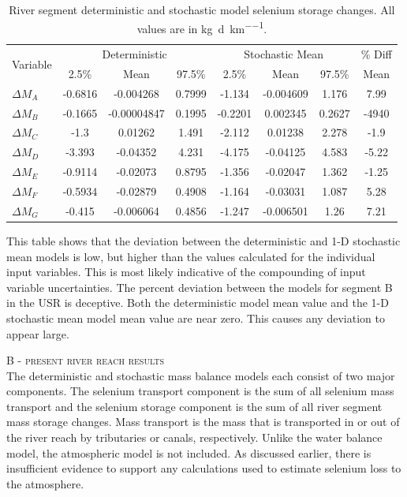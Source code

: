 \begin{linenumbers}
\begin{table}[htbp]
\centering
\caption[River segment deterministic and stochastic model selenium storage changes.]{River segment deterministic and stochastic model selenium storage changes.  All values are in \si{\kilo\gram\per\day\per\kilo\meter}.}
\label{tab:ReachSeStore}
    \begin{tabular}{l|ccc|ccc|c}
    \toprule
    \multirow{2}[0]{*}{Variable} & \multicolumn{3}{c}{Deterministic} & \multicolumn{3}{c}{Stochastic Mean} & \% Diff\\\cline{2-4} \cline{5-7}
    & 2.5\% & Mean & 97.5\% & 2.5\% & Mean & 97.5\% & Mean\\
    \midrule
    \midrule
	$\Delta M_A$&	-0.6816&	-0.004268&	0.7999&	-1.134&	-0.004609&	1.176&	7.99\\         
	$\Delta M_B$&	-0.1665&	-0.00004847&	0.1995&	-0.2201&	0.002345&	0.2627&	-4940\\
	$\Delta M_C$&	-1.3&	0.01262&	1.491&	-2.112&	0.01238&	2.278&	-1.9\\             
	$\Delta M_D$&	-3.393&	-0.04352&	4.231&	-4.175&	-0.04125&	4.583&	-5.22\\            
	$\Delta M_E$&	-0.9114&	-0.02073&	0.8795&	-1.356&	-0.02047&	1.362&	-1.25\\        
	$\Delta M_F$&	-0.5934&	-0.02879&	0.4908&	-1.164&	-0.03031&	1.087&	5.28\\         
	$\Delta M_G$&	-0.415&	-0.006064&	0.4856&	-1.247&	-0.006501&	1.26&	7.21\\             
	\bottomrule
	\end{tabular}
\end{table}

This table shows that the deviation between the deterministic and 1-D stochastic mean models is low, but higher than the values calculated for the individual input variables.  This is most likely indicative of the compounding of input variable uncertainties.  The percent deviation between the models for segment B in the USR is deceptive.  Both the deterministic model mean value and the 1-D stochastic mean model mean value are near zero.  This causes any deviation to appear large.

\textsc{B - present river reach results}\\

The deterministic and stochastic mass balance models each consist of two major components.  The selenium transport component is the sum of all selenium mass transport and the selenium storage component is the sum of all river segment mass storage changes.  Mass transport is the mass that is transported in or out of the river reach by tributaries or canals, respectively.  Unlike the water balance model, the atmospheric model is not included.  As discussed earlier, there is insufficient evidence to support any calculations used to estimate selenium loss to the atmosphere.


\end{linenumbers}
